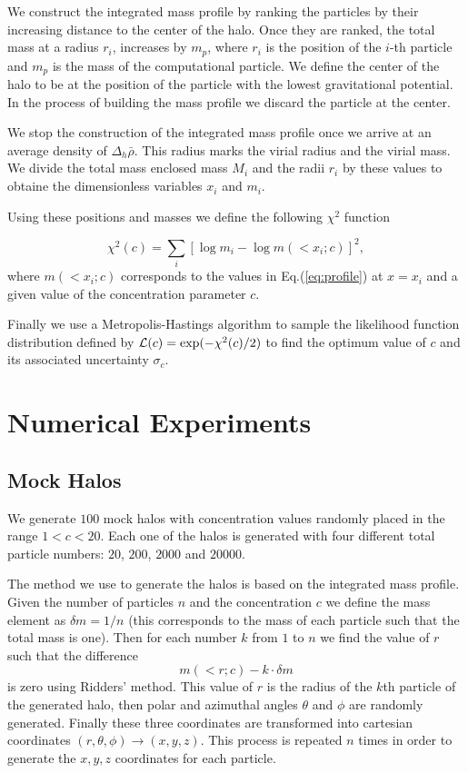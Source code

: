 \documentclass[useAMS,usenatbib]{mn2e}
\begin{document}
We construct the integrated mass profile by ranking the particles by
their increasing distance to the center of the halo. Once they are ranked,
the total mass at a radius $r_i$, increases by $m_p$, where $r_i$ is
the position of the $i$-th particle and $m_p$ is the mass of the
computational particle.  We define the center of the halo to be  at
the position of the particle with the lowest gravitational
potential. In the process of building the mass profile we discard the
particle at the center.

We stop the construction of the integrated mass profile once we arrive
at an average density of $\Delta_h\bar{\rho}$. This radius marks the
virial radius and the virial mass. We divide the total mass enclosed
mass $M_i$ and the radii $r_i$ by these values to obtaine the
dimensionless variables $x_i$ and $m_i$. 

Using these positions and masses we define the following $\chi^2$ function

\begin{equation}
\chi^2(c) = \sum_{i}[\log m_i - \log m(< x_i;c)]^2, 
\end{equation}
%
where $m(<x_i;c)$ corresponds to the values in Eq.(\ref{eq:profile}) at
$x=x_i$ and a given value of the concentration parameter $c$.

Finally we use a Metropolis-Hastings algorithm to sample the likelihood
function distribution defined by ${\cal L}(c)=\exp(-\chi^2(c)/2)$ to
find the optimum value of $c$ and its associated uncertainty
$\sigma_c$. 

\section{Numerical Experiments}

\subsection{Mock Halos}

We generate $100$ mock halos with concentration values randomly
placed in the range $1<c<20$. Each one of the halos is generated with
four different total particle numbers: $20$, $200$, $2000$ and $20000$.

The method we use to generate the halos is based on the integrated
mass profile. Given the number of particles $n$ and the concentration
$c$ we define the mass element as $\delta m = 1/n$ (this corresponds
to the mass of each particle such that the total mass is one). Then
for each number $k$ from $1$ to $n$ we find the value of $r$ such that
the difference 
%
\begin{equation}
m(<r;c)-k \cdot \delta m 
\end{equation}
%
is zero using Ridders' method. This value of $r$ is the radius of
the $k$th particle of the generated halo, then polar and azimuthal
angles $\theta$ and $\phi$ are randomly generated. Finally these three
coordinates are transformed into cartesian coordinates
$(r,\theta,\phi) \rightarrow (x,y,z)$. This process is repeated $n$
times in order to generate the $x,y,z$ coordinates for each particle. 
\end{document}
